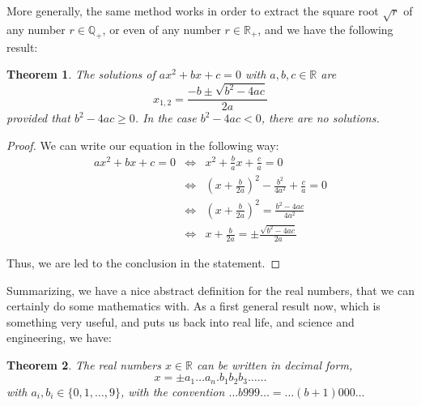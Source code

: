 \documentclass[12pt]{amsbook}
\newtheorem{theorem}{Theorem}[chapter]
\begin{document}
More generally, the same method works in order to extract the square root $\sqrt{r}$ of any number $r\in\mathbb Q_+$, or even of any number $r\in\mathbb R_+$, and we have the following result:

\begin{theorem}
The solutions of $ax^2+bx+c=0$ with $a,b,c\in\mathbb R$ are
$$x_{1,2}=\frac{-b\pm\sqrt{b^2-4ac}}{2a}$$
provided that $b^2-4ac\geq0$. In the case $b^2-4ac<0$, there are no solutions.
\end{theorem}

\begin{proof}
We can write our equation in the following way:
\begin{eqnarray*}
ax^2+bx+c=0
&\iff&x^2+\frac{b}{a}x+\frac{c}{a}=0\\
&\iff&\left(x+\frac{b}{2a}\right)^2-\frac{b^2}{4a^2}+\frac{c}{a}=0\\
&\iff&\left(x+\frac{b}{2a}\right)^2=\frac{b^2-4ac}{4a^2}\\
&\iff&x+\frac{b}{2a}=\pm\frac{\sqrt{b^2-4ac}}{2a}
\end{eqnarray*}

Thus, we are led to the conclusion in the statement.
\end{proof}

Summarizing, we have a nice abstract definition for the real numbers, that we can certainly do some mathematics with. As a first general result now, which is something very useful, and puts us back into real life, and science and engineering, we have:

\begin{theorem}
The real numbers $x\in\mathbb R$ can be written in decimal form,
$$x=\pm a_1\ldots a_n.b_1b_2b_3\ldots\ldots$$
with $a_i,b_i\in\{0,1,\ldots,9\}$, with the convention $\ldots b999\ldots=\ldots(b+1)000\ldots$
\end{theorem}
\end{document}
